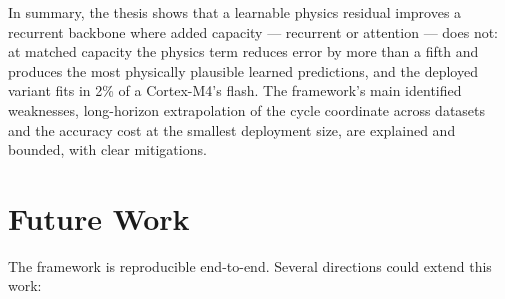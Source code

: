 In summary, the thesis shows that a learnable physics residual improves a
recurrent backbone where added capacity --- recurrent or attention --- does
not: at matched capacity the physics term reduces error by more than a fifth
and produces the most physically plausible learned predictions, and the
deployed variant fits in 2\% of a Cortex-M4's flash. The framework's main identified
weaknesses, long-horizon extrapolation of the cycle coordinate across datasets
and the accuracy cost at the smallest deployment size, are explained and
bounded, with clear mitigations.

\section{Future Work}

The framework is reproducible end-to-end. Several directions could extend this
work:

